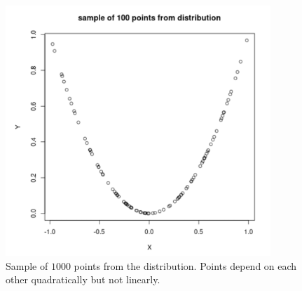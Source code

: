 \documentclass[12pt, a4paper]{article}
\begin{document}
\begin{figure}[H]
\centering
\includegraphics[width=100mm]{22.png}
\caption{Sample of $1000$ points from the distribution. Points depend on each other quadratically but not linearly.}
\end{figure}
\end{document}
